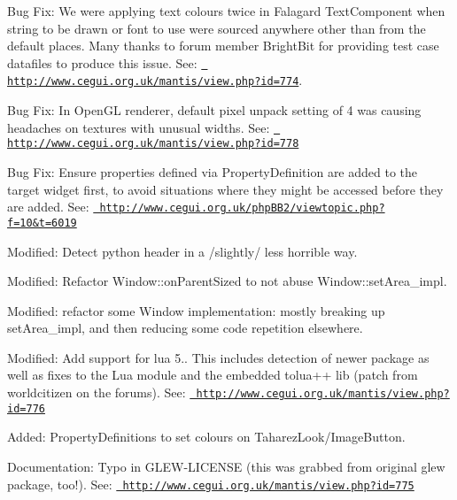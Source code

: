 \begin{DoxyItemize}
\item Bug Fix\+: We were applying text colours twice in Falagard Text\+Component when string to be drawn or font to use were sourced anywhere other than from the default places. Many thanks to forum member \textquotesingle{}Bright\+Bit\textquotesingle{} for providing test case datafiles to produce this issue. See\+: \href{http://www.cegui.org.uk/mantis/view.php?id=774}{\texttt{ http\+://www.\+cegui.\+org.\+uk/mantis/view.\+php?id=774}}.
\item Bug Fix\+: In Open\+GL renderer, default pixel unpack setting of 4 was causing headaches on textures with unusual widths. See\+: \href{http://www.cegui.org.uk/mantis/view.php?id=778}{\texttt{ http\+://www.\+cegui.\+org.\+uk/mantis/view.\+php?id=778}}
\item Bug Fix\+: Ensure properties defined via Property\+Definition are added to the target widget first, to avoid situations where they might be accessed before they are added. See\+: \href{http://www.cegui.org.uk/phpBB2/viewtopic.php?f=10&t=6019}{\texttt{ http\+://www.\+cegui.\+org.\+uk/php\+B\+B2/viewtopic.\+php?f=10\&t=6019}}
\item Modified\+: Detect python header in a /slightly/ less horrible way.
\item Modified\+: Refactor Window\+::on\+Parent\+Sized to not abuse Window\+::set\+Area\+\_\+impl.
\item Modified\+: refactor some Window implementation\+: mostly breaking up set\+Area\+\_\+impl, and then reducing some code repetition elsewhere.
\item Modified\+: Add support for lua 5.. This includes detection of newer package as well as fixes to the Lua module and the embedded tolua++ lib (patch from \textquotesingle{}worldcitizen\textquotesingle{} on the forums). See\+: \href{http://www.cegui.org.uk/mantis/view.php?id=776}{\texttt{ http\+://www.\+cegui.\+org.\+uk/mantis/view.\+php?id=776}}
\item Added\+: Property\+Definitions to set colours on Taharez\+Look/\+Image\+Button.
\item Documentation\+: Typo in G\+L\+E\+W-\/\+L\+I\+C\+E\+N\+SE (this was grabbed from original glew package, too!). See\+: \href{http://www.cegui.org.uk/mantis/view.php?id=775}{\texttt{ http\+://www.\+cegui.\+org.\+uk/mantis/view.\+php?id=775}}
\end{DoxyItemize}

